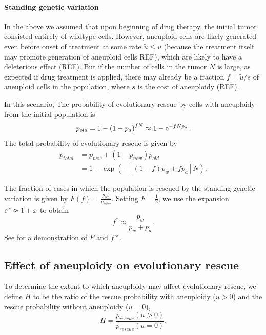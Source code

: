 \documentclass[12pt]{extarticle}
\newcommand{\e}{{\rm e}}
\begin{document}
\paragraph*{Standing genetic variation}

In the above we assumed that upon beginning of drug therapy, the initial tumor consisted entirely of wildtype cells.
However, aneuploid cells are likely generated even before onset of treatment at some rate $\tilde{u} \le u$ (because the treatment itself may promote generation of aneuploid cells REF), which are likely to have a deleterious effect (REF). But if the number of cells in the tumor $N$ is large, as expected if drug treatment is applied, there may already be a fraction $f=\tilde{u}/s$ of aneuploid cells in the population, where $s$ is the cost of aneuploidy (REF).

In this scenario, The probability of evolutionary rescue by cells with aneuploidy from the initial population is
\begin{equation*}
p_{old} = 1-\left(1-p_a\right)^{fN}\approx 1-\e^{-fNp_a}. %
\end{equation*}
The total probability of evolutionary rescue is given by
\begin{align}\nonumber
p_{total} 	&= p_{new}+\left(1-p_{new}\right)p_{old}\\ %
			&= 1-\exp\left(-\left[\left(1-f\right)p_w + fp_a\right]N\right) .
\end{align}

The fraction of cases in which the population is rescued by the standing genetic variation is given by $F\left(f\right)=\frac{p_{old}}{p_{total}}$.
Setting $F=\frac{1}{2}$, we use the expansion $\e^x \approx 1+x$ to obtain
\begin{equation}\label{halfeqstandvar} %
f^*\approx\frac{p_w}{p_w+p_a}.
\end{equation}
See  for a demonstration of $F$ and $f*$. 

\subsection*{Effect of aneuploidy on evolutionary rescue}
To determine the extent to which aneuploidy may affect evolutionary rescue, we define $H$ to be the ratio of the rescue probability with aneuploidy ($u>0$) and the rescue probability without aneuploidy ($u=0$),
\begin{equation}\label{ratiorescueexact}
H = \frac{p_{rescue}(u>0)}{p_{rescue}(u=0)}.
\end{equation}
\end{document}
